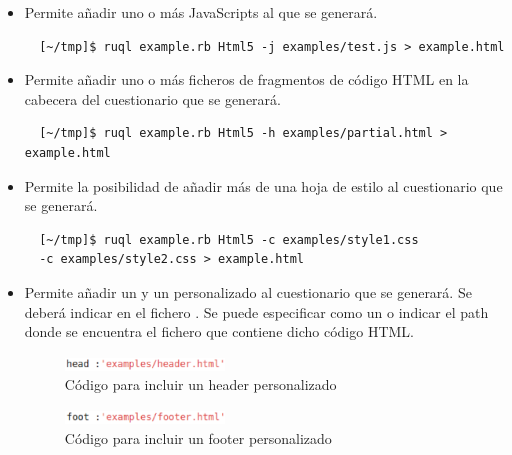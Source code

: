 \begin{itemize}
  \item Permite a\~{n}adir uno o m\'as JavaScripts al  que se generar\'a.
  \begin{verbatim}
  [~/tmp]$ ruql example.rb Html5 -j examples/test.js > example.html
  \end{verbatim}
  
  \item Permite a\~{n}adir uno o m\'as ficheros de fragmentos de c\'odigo HTML en la cabecera 
  del cuestionario que se generar\'a.
  \begin{verbatim}
  [~/tmp]$ ruql example.rb Html5 -h examples/partial.html > example.html
  \end{verbatim}
  
  \item Permite la posibilidad de a\~{n}adir m\'as de una hoja de estilo  al cuestionario que se generar\'a.
  \begin{verbatim}
  [~/tmp]$ ruql example.rb Html5 -c examples/style1.css 
  -c examples/style2.css > example.html
  \end{verbatim}
  
  \item Permite a\~{n}adir un  y un  personalizado al cuestionario que se generar\'a. Se deber\'a indicar
  en el fichero . Se puede especificar como un  o indicar el path donde se encuentra el fichero que contiene 
  dicho c\'odigo HTML.
  
  \begin{figure}[!th]
  \begin{center}
  \includegraphics[width=0.4\textwidth]{images/header.eps}
  \caption{C\'odigo para incluir un header personalizado}
  \label{fig:header}
  \end{center}
  \end{figure}
  
  \begin{figure}[!th]
  \begin{center}
  \includegraphics[width=0.4\textwidth]{images/footer.eps}
  \caption{C\'odigo para incluir un footer personalizado}
  \label{fig:footer}
  \end{center}
  \end{figure}


\end{itemize}
